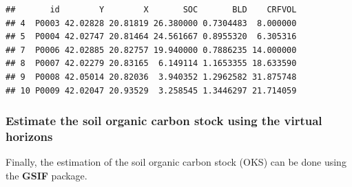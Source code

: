 \documentclass[10pt,b5paper,]{book}
\newenvironment{Shaded}{\begin{snugshade}}{\end{snugshade}}
\newcommand{\CommentTok}[1]{\textcolor[rgb]{0.56,0.35,0.01}{\textit{#1}}}
\newcommand{\DataTypeTok}[1]{\textcolor[rgb]{0.13,0.29,0.53}{#1}}
\newcommand{\DecValTok}[1]{\textcolor[rgb]{0.00,0.00,0.81}{#1}}
\newcommand{\KeywordTok}[1]{\textcolor[rgb]{0.13,0.29,0.53}{\textbf{#1}}}
\newcommand{\NormalTok}[1]{#1}
\newcommand{\OperatorTok}[1]{\textcolor[rgb]{0.81,0.36,0.00}{\textbf{#1}}}
\newcommand{\StringTok}[1]{\textcolor[rgb]{0.31,0.60,0.02}{#1}}
\theoremstyle{definition}
\theoremstyle{definition}
\theoremstyle{definition}
\theoremstyle{remark}
\begin{document}
\begin{verbatim}
##       id        Y        X       SOC       BLD    CRFVOL
## 4  P0003 42.02828 20.81819 26.380000 0.7304483  8.000000
## 5  P0004 42.02747 20.81464 24.561667 0.8955320  6.305316
## 7  P0006 42.02885 20.82757 19.940000 0.7886235 14.000000
## 8  P0007 42.02279 20.83165  6.149114 1.1653355 18.633590
## 9  P0008 42.05014 20.82036  3.940352 1.2962582 31.875748
## 10 P0009 42.02047 20.93529  3.258545 1.3446297 21.714059
\end{verbatim}

\hypertarget{estimate-the-soil-organic-carbon-stock-using-the-virtual-horizons}{%
\subsubsection{Estimate the soil organic carbon stock using the virtual
horizons}\label{estimate-the-soil-organic-carbon-stock-using-the-virtual-horizons}}

Finally, the estimation of the soil organic carbon stock (OKS) can be
done using the \textbf{GSIF} package.

\begin{Shaded}
\end{Shaded}
\end{document}
